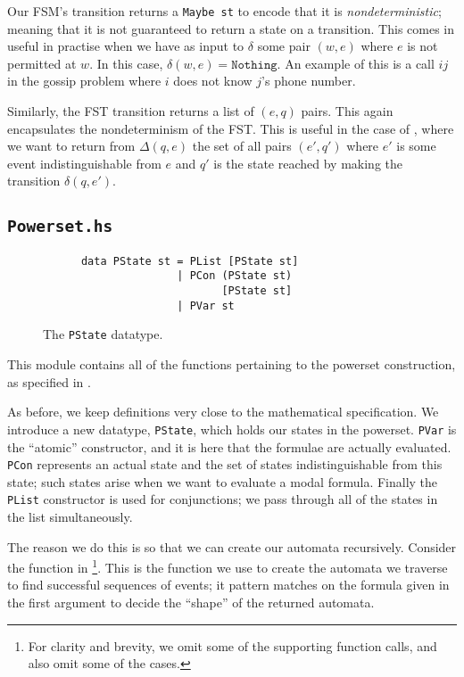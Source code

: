 \documentclass[12pt, a4paper]{article}
\begin{document}
Our FSM's transition returns a \texttt{Maybe st} to encode that it is
\textit{nondeterministic}; meaning that it is not guaranteed to return a state
on a transition. This comes in useful in practise when we have as input to
$\delta$ some pair $(w, e)$ where $e$ is not permitted at $w$. In this case,
$\delta(w, e) = \texttt{Nothing}$. An example of this is a call $ij$ in the
gossip problem where $i$ does not know $j$'s phone number.

Similarly, the FST transition returns a list of $(e, q)$ pairs. This again
encapsulates the nondeterminism of the FST. This is useful in the case of
, where we want to return from
$\Delta(q, e)$ the set of all pairs $(e', q')$ where $e'$ is some event
indistinguishable from $e$ and $q'$ is the state reached by making the
transition $\delta(q, e')$. 

\subsection{\texttt{Powerset.hs}}

\begin{wrapfigure}{r}{0.5\textwidth}
  \begin{center}
    \begin{verbatim}
      data PState st = PList [PState st] 
                     | PCon (PState st) 
                            [PState st] 
                     | PVar st 
    \end{verbatim}
  \end{center}
  \caption{The \texttt{PState} datatype.}
\end{wrapfigure}

This module contains all of the functions pertaining to the powerset
construction, as specified in .

As before, we keep definitions very close to the mathematical specification. We
introduce a new datatype, \texttt{PState}, which holds our states in the
powerset. \texttt{PVar} is the ``atomic'' constructor, and it is here that the
formulae are actually evaluated. \texttt{PCon} represents an actual state and
the set of states indistinguishable from this state; such states arise when we
want to evaluate a modal formula. Finally the \texttt{PList} constructor is used for
conjunctions; we pass through all of the states in the list simultaneously.

The reason we do this is so that we can create our automata recursively.
Consider the function in \footnote{For clarity
  and brevity, we omit some of the supporting function calls, and also omit some
  of the cases.}. This is the function we use to create the automata we traverse
to find successful sequences of events; it pattern matches on the formula given
in the first argument to decide the ``shape'' of the returned automata.
\end{document}
